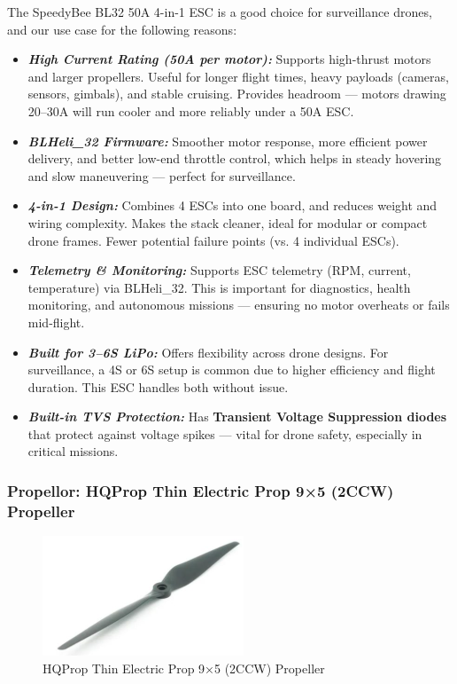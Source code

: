 \documentclass[12pt]{report}
\begin{document}
      The SpeedyBee BL32 50A 4-in-1 ESC is a good choice for surveillance drones, and our use case for the following reasons:
      \begin{itemize}
        \item \textbf{\textit{High Current Rating (50A per motor):}} Supports high-thrust motors and larger propellers. Useful for longer flight times, heavy payloads (cameras, sensors, gimbals), and stable cruising. Provides headroom — motors drawing 20–30A will run cooler and more reliably under a 50A ESC.
        \item \textbf{\textit{BLHeli\_32 Firmware:}} Smoother motor response, more efficient power delivery, and better low-end throttle control, which helps in steady hovering and slow maneuvering — perfect for surveillance.
        \item \textbf{\textit{4-in-1 Design:}} Combines 4 ESCs into one board, and reduces weight and wiring complexity. Makes the stack cleaner, ideal for modular or compact drone frames. Fewer potential failure points (vs. 4 individual ESCs).
        \item \textbf{\textit{Telemetry \& Monitoring:}} Supports ESC telemetry (RPM, current, temperature) via BLHeli\_32. This is important for diagnostics, health monitoring, and autonomous missions — ensuring no motor overheats or fails mid-flight.
        \item \textbf{\textit{Built for 3–6S LiPo:}} Offers flexibility across drone designs. For surveillance, a 4S or 6S setup is common due to higher efficiency and flight duration. This ESC handles both without issue.
        \item \textbf{\textit{Built-in TVS Protection:}} Has \textbf{Transient Voltage Suppression diodes} that protect against voltage spikes — vital for drone safety, especially in critical missions.
      \end{itemize}

      \subsubsection{\large Propellor: HQProp Thin Electric Prop 9×5 (2CCW) Propeller}
      \begin{figure}
        \includegraphics[width=1\linewidth]{prop.png}
        \caption{HQProp Thin Electric Prop 9×5 (2CCW) Propeller}
        \label{fig:prop9x5}
      \end{figure}
\end{document}
